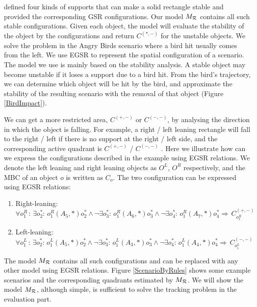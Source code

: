 \documentclass[letterpaper]{article}
\begin{document}
\cite{Ge2013} defined four kinds of supports that can make a solid rectangle stable and provided the corresponding GSR configurations. Our model $M_{\cal R}$ contains all such stable configurations. Given each object, the model will evaluate the stability of the object by the configurations and return $C^{(*,-)}$ for the unstable objects. We solve the problem in the Angry Birds scenario where a bird hit usually comes from the left. We use EGSR to represent the spatial configuration of a scenario. The model we use is mainly based on the stability analysis. A stable object may become unstable if it loses a support due to a bird hit. From the bird's trajectory, we can determine which object will be hit by the bird, and approximate the stability of the resulting scenario with the removal of that object (Figure \ref{BirdImpact}). 

We can get a more restricted area, $C^{(+,-)}$ or $C^{(-,-)}$, by analysing the direction in which the object is falling. For example, a right / left leaning rectangle will fall to the right / left if there is no support at the right / left side, and the corresponding active quadrant is $C^{(+,-)}$ / $C^{(-, -)}$%
. Here we illustrate how can we express the configurations described in the example using EGSR relations. We denote the left leaning and right leaning objects as $O^L$, $O^R$ respectively, and the MBC of an object $o$ is written as $C_{o}$. The two configuration can be expressed using EGSR relations:
\begin{enumerate}
\item Right-leaning: $\forall o^R_1\,:\, \exists o^*_2:\,o^R_1 (A_5, *) o^*_2 \wedge\neg\exists o^*_3:\,o^R_1 (A_6, *) o^*_3 \wedge\neg\exists o^*_4:\,o^R_1 (A_7, *) o^*_4 \Rightarrow \, C_{o^R_1}^{(+,-)}$

\item Left-leaning: $\forall o^L_1\,:\, \exists o^*_2:\,o^L_1 (A_5, *) o^*_2 \wedge\neg\exists o^*_3:\,o^L_1 (A_3, *) o^*_3 \wedge\neg\exists o^*_4:\,o^L_1 (A_4, *) o^*_4 \Rightarrow \, C_{o^L_1}^{(-,-)}$
\end{enumerate}
The model $M_{\cal{R}}$ contains all such configurations and can be replaced with any other model using EGSR relations. Figure \ref{ScenarioByRules} shows some example scenarios and the corresponding quadrants estimated by $M_{\cal{R}}$. We will show the model $M_{\cal{R}}$, although simple, is sufficient to solve the tracking problem in the evaluation part.  


\end{document}
